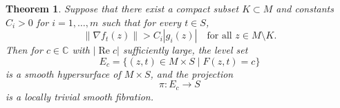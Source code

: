 \documentclass[11pt]{amsart}
\theoremstyle{plain}
\newtheorem{theorem}{Theorem}[section]
\theoremstyle{definition}
\theoremstyle{remark}
\numberwithin{equation}{section}
\begin{document}
\begin{theorem}\label{thm:deformation}
    Suppose that there exist a compact subset $K \subset M$ and constants $C_i > 0$ for $i = 1, \ldots, m$ such that for every $t \in S$,
    \begin{equation}
        \|\nabla f_t(z)\| > C_i |g_i(z)| \quad \text{for all } z \in M \setminus K.
    \end{equation}
    Then for $c \in \mathbb{C}$ with $|\operatorname{Re} c|$ sufficiently large, the level set
    \begin{equation}
        E_c = \{(z,t) \in M \times S \mid F(z,t) = c\}
    \end{equation}
    is a smooth hypersurface of $M \times S$, and the projection
    \begin{equation}
        \pi : E_c \to S
    \end{equation}
    is a locally trivial smooth fibration.
\end{theorem}
\end{document}
